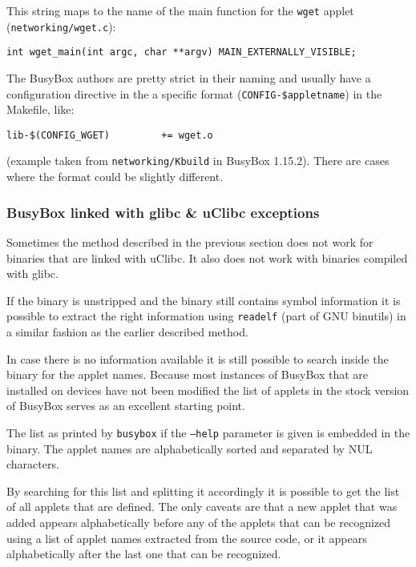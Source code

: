 \documentclass[10pt,a4paper]{article}
\begin{document}
This string maps to the name of the main function for the \texttt{wget} applet
(\texttt{networking/wget.c}):

\begin{verbatim}
int wget_main(int argc, char **argv) MAIN_EXTERNALLY_VISIBLE;
\end{verbatim}

The BusyBox authors are pretty strict in their naming and usually have a
configuration directive in the a specific format
(\texttt{CONFIG-\$appletname}) in the Makefile, like:

\begin{verbatim}
lib-$(CONFIG_WGET)         += wget.o
\end{verbatim}

(example taken from \texttt{networking/Kbuild} in BusyBox 1.15.2). There are
cases where the format could be slightly different.

\subsubsection{BusyBox linked with glibc \& uClibc exceptions}

Sometimes the method described in the previous section does not work for
binaries that are linked with uClibc. It also does not work with binaries
compiled with glibc.

If the binary is unstripped and the binary still contains symbol information
it is possible to extract the right information using \texttt{readelf} (part
of GNU binutils) in a similar fashion as the earlier described method.

In case there is no information available it is still possible to search inside
the binary for the applet names. Because most instances of BusyBox that are
installed on devices have not been modified the list of applets in the stock
version of BusyBox serves as an excellent starting point.

The list as printed by \texttt{busybox} if the \texttt{--help} parameter is
given is embedded in the binary. The applet names are alphabetically sorted
and separated by NUL characters.

By searching for this list and splitting it accordingly it is possible to get
the list of all applets that are defined. The only caveats are that a new
applet that was added appears alphabetically before any of the applets that
can be recognized using a list of applet names extracted from the source code,
or it appears alphabetically after the last one that can be recognized.
\end{document}
